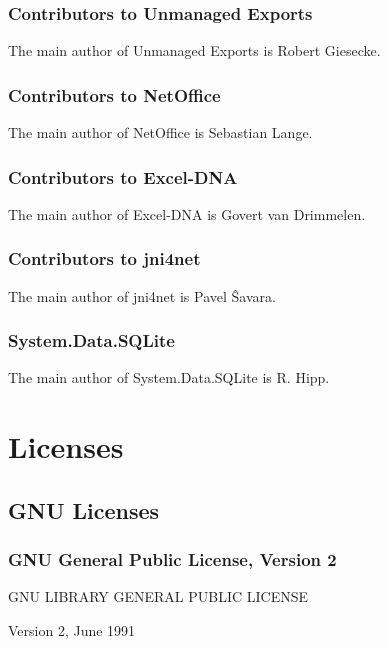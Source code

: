 \subsection{Contributors to Unmanaged Exports}
\label{Contributors to Unmanaged Exports}
The main author of Unmanaged Exports is Robert Giesecke.


\subsection{Contributors to NetOffice}
\label{Contributors to NetOffice}
The main author of NetOffice is Sebastian Lange.


\subsection{Contributors to Excel-DNA}
\label{Contributors to Excel-DNA}
The main author of Excel-DNA is Govert van Drimmelen.



\subsection{Contributors to jni4net}
\label{Contributors to jni4net}
The main author of jni4net is Pavel \^{S}avara.


\subsection{System.Data.SQLite}
\label{Contributors to System.Data.SQLite}
The main author of System.Data.SQLite is R. Hipp.



\small
\chapter{Licenses} %
\section{GNU Licenses}



\subsection{GNU General Public License, Version 2}
\label{GPLv2}
\begin{center}
	GNU LIBRARY GENERAL PUBLIC LICENSE
	
	Version 2, June 1991 
\end{center}


